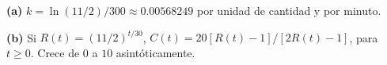 \noindent\textbf{(a)} $k=\ln(11/2)/300\approx0.00568249$ por unidad de cantidad y por minuto.

\noindent\textbf{(b)} Si $R(t)=(11/2)^{t/30}$, $C(t)=20[R(t)-1]/[2R(t)-1]$, para $t\ge0$. Crece de $0$ a $10$ asintóticamente.

